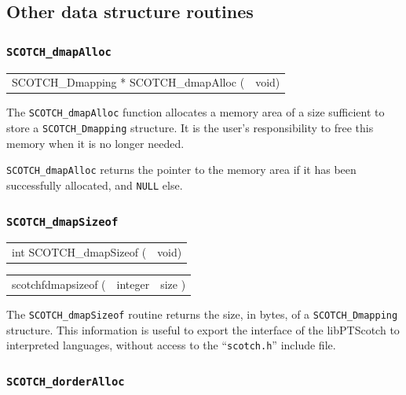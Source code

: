 \subsection{Other data structure routines}
\label{sec-lib-other}

\subsubsection{{\tt SCOTCH\_dmapAlloc}}

\begin{itemize}
\progsyn

{\tt\begin{tabular}{l@{}l}
SCOTCH\_Dmapping * SCOTCH\_dmapAlloc ( & void)
\end{tabular}}

\progdes

The {\tt SCOTCH\_dmapAlloc} function allocates a memory area of a
size sufficient to store a {\tt SCOTCH\_\lbt Dmapping} structure. It is
the user's responsibility to free this memory when it is no longer
needed.

\progret

{\tt SCOTCH\_dmapAlloc} returns the pointer to the memory area if it
has been successfully allocated, and {\tt NULL} else.
\end{itemize}

\subsubsection{{\tt SCOTCH\_dmapSizeof}}

\begin{itemize}
\progsyn

{\tt\begin{tabular}{l@{}l}
int SCOTCH\_dmapSizeof ( & void)
\end{tabular}}

{\tt\begin{tabular}{l@{}ll}
scotchfdmapsizeof ( & integer & size )
\end{tabular}}

\progdes

The {\tt SCOTCH\_dmapSizeof} routine returns the size, in bytes, of a
{\tt SCOTCH\_\lbt Dmapping} structure. This information is useful to
export the interface of the {\sc libPTScotch} to interpreted languages,
without access to the ``{\tt scotch.h}'' include file.
\end{itemize}

\subsubsection{{\tt SCOTCH\_dorderAlloc}}

